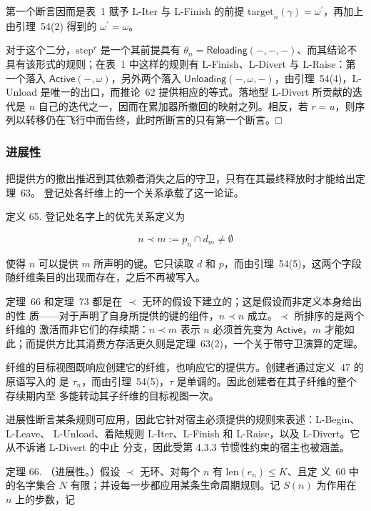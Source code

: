 \documentclass[
  10
]{article}
\begin{document}
第一个断言因而是表~1 赋予 L-Iter 与 L-Finish 的前提 \(\mathrm { t a r g e t } _ { n } ( \gamma ) = \omega ^ { \prime }\)，再加上由引理~54(2) 得到的 \(\omega ^ { \prime } = \omega\)。

对于这个二分，\(\mathrm { s t e p } ^ { r }\) 是一个其前提具有 \(\theta _ { n } = \mathsf { R e l o a d i n g } ( - , - , - )\)、而其结论不具有该形式的规则；在表~1 中这样的规则有 L-Finish、L-Divert 与 L-Raise：第一个落入 \(\mathsf { A c t i v e } ( - , \omega )\)，另外两个落入 \(\mathsf { U n l o a d i n g } ( - , \omega , - )\)，由引理~54(4)，L-Unload 是唯一的出口，而推论~62 提供相应的等式。落地型 L-Divert 所贡献的迭代是 \(n\) 自己的迭代之一，因而在累加器所撤回的映射之列。相反，若 \(r = u\)，则序列以转移仍在飞行中而告终，此时所断言的只有第一个断言。□
\subsubsection{进展性} \label{progress}

把提供方的撤出推迟到其依赖者消失之后的守卫，只有在其最终释放时才能给出定理~63。
登记处各纤维上的一个关系承载了这一论证。

定义 65. 登记处名字上的优先关系定义为

\[
n \prec m := p_{n} \cap d_{m} \neq \emptyset \tag{60}
\]

使得 \(n\) 可以提供 \(m\) 所声明的键。它只读取 \(d\) 和 \(p\)，而由引理~54(5)，这两个字段
随纤维条目的出现而存在，之后不再被写入。

定理~66 和定理~73 都是在 \(\prec\) 无环的假设下建立的；这是假设而非定义本身给出的性
质——对于声明了自身所提供的键的组件，\(n \prec n\) 成立。\(\prec\) 所排序的是两个纤维的
激活而非它们的存续期：\(n \prec m\) 表示 \(n\) 必须首先变为 \(\mathsf{Active}\)，\(m\) 才能如
此；而提供方比其消费方存活更久则是定理~63(2)，一个关于带守卫演算的定理。

纤维的目标视图既响应创建它的纤维，也响应它的提供方。创建者通过定义~47 的原语写入的
是 \(\tau_{n}\)，而由引理~54(5)，\(\tau\) 是单调的。因此创建者在其子纤维的整个存续期内至
多能转动其子纤维的目标视图一次。

进展性断言某条规则可应用，因此它针对宿主必须提供的规则来表述：L-Begin、L-Leave、
L-Unload、着陆规则 L-Iter、L-Finish 和 L-Raise，以及 L-Divert。它从不诉诸 L-Divert 的中止
分支，因此受第 4.3.3 节惯性约束的宿主也被涵盖。

定理 66. （进展性。）假设 \(\prec\) 无环、对每个 \(n\) 有 \(\mathrm{len}(e_{n}) \leq K\)、且定
义~60 中的名字集合 \(N\) 有限；并设每一步都应用某条生命周期规则。记 \(S(n)\) 为作用在
\(n\) 上的步数，记
\end{document}
